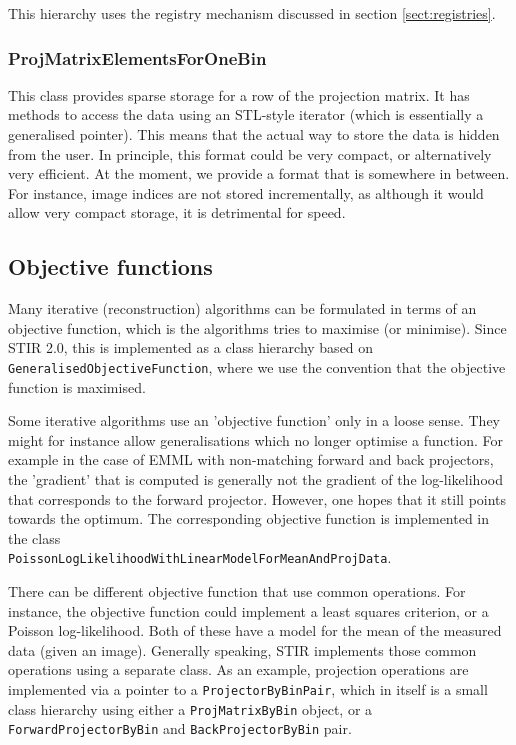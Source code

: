 \documentclass{article}
\begin{document}
This hierarchy uses the registry mechanism discussed in section 
\ref{sect:registries}.


\subsubsection{
ProjMatrixElementsForOneBin }

This class provides sparse storage for a row of the projection 
matrix. It has methods to access the data using an STL-style 
iterator (which is essentially a generalised pointer). This means 
that the actual way to store the data is hidden from the user. 
In principle, this format could be very compact, or alternatively 
very efficient. At the moment, we provide a format that is somewhere 
in between. For instance, image indices are not stored incrementally, 
as although it would allow very compact storage, it is detrimental 
for speed.

\subsection{Objective functions}
Many iterative (reconstruction) algorithms can be formulated in terms
of an objective function, which is the algorithms tries to 
maximise (or minimise). Since STIR 2.0, this is implemented
as a class hierarchy based on \texttt{GeneralisedObjectiveFunction},
where we use the convention that the objective function is maximised. 

Some iterative algorithms use an 'objective function' only in a 
loose sense. They might for instance allow generalisations 
which no longer optimise a function. For example in the case
of EMML with non-matching forward and back projectors, the 'gradient' 
that is computed is generally not the gradient of the
log-likelihood that corresponds to the forward projector.
However, one hopes that it still points towards the optimum.
The corresponding objective function is implemented in the class\\
\texttt{PoissonLogLikelihoodWithLinearModelForMeanAndProjData}.

There can be different objective function that use common operations.
For instance, the objective function could implement a least squares
criterion, or a Poisson log-likelihood. Both of these have a model
for the mean of the measured data (given an image). Generally speaking,
STIR implements those common operations using a separate class.
As an example, projection operations are implemented via a pointer to a 
\texttt{ProjectorByBinPair}, which in itself is a small
class hierarchy using either a \texttt{ProjMatrixByBin} object, 
or a \texttt{ForwardProjectorByBin} and \texttt{BackProjectorByBin} pair.
\end{document}
